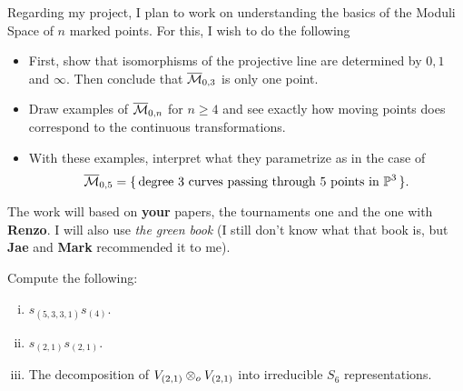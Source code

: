 \documentclass[12pt]{memoir}
\begin{document}
Regarding my project, I plan to work on understanding the basics of the Moduli Space of $n$ marked points. For this, I wish to do the following
\begin{itemize}
    \item First, show that isomorphisms of the projective line are determined by $0,1$ and $\infty$. Then conclude that $\overline{\mathcal{M}}_{0,3}$ is only one point.
    \item Draw examples of $\overline{\mathcal{M}}_{0,n}$ for $n\geq 4$ and see exactly how moving points does correspond to the continuous transformations.
    \item With these examples, interpret what they parametrize as in the case of 
    $$\overline{\mathcal{M}}_{0,5}=\{\,\text{degree }3\text{ curves passing through }5\text{ points in }\mathbb{P}^3\,\}.$$
\end{itemize}
The work will based on \textbf{your} papers, the tournaments one and the one with \textbf{Renzo}. I will also use \emph{the green book} (I still don't know what that book is, but \textbf{Jae} and \textbf{Mark} recommended it to me).   

\begin{Ej}[Exercise 2]
    Compute the following:\vspace{-0.4em}
    \begin{enumerate}[i)]
        \itemsep=-0.4em
        \item $s_{(5,3,3,1)}s_{(4)}$.
        \item $s_{(2,1)}s_{(2,1)}$.
        \item The decomposition of $V_{(2,1)}\otimes_oV_{(2,1)}$ into irreducible $S_6$ representations.
    \end{enumerate}
\end{Ej}
\end{document}
